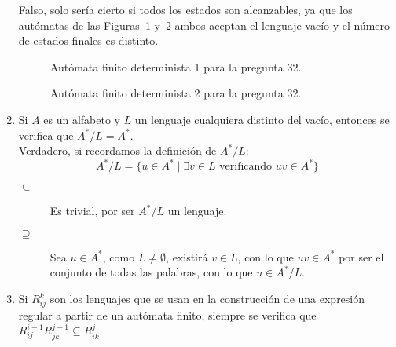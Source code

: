 \begin{enumerate}
        Falso, solo sería cierto si todos los estados son alcanzables, ya que los autómatas de las Figuras~\ref{fig:tipo_test32_1} y~\ref{fig:tipo_test32_2} ambos aceptan el lenguaje vacío y el número de estados finales es distinto.
        \begin{figure}[H]
           \centering
           \caption{Autómata finito determinista 1 para la pregunta 32.}
           \label{fig:tipo_test32_1}
       \end{figure}

       \begin{figure}[H]
           \centering
           \caption{Autómata finito determinista 2 para la pregunta 32.}
           \label{fig:tipo_test32_2}
       \end{figure}
    \item Si $A$ es un alfabeto y $L$ un lenguaje cualquiera distinto del vacío, entonces se verifica que $A^\ast / L = A^\ast$.\\

        Verdadero, si recordamos la definición de $A^\ast / L$:
        \begin{equation*}
            A^\ast / L = \{u\in A^\ast \mid \exists v\in L \text{\ verificando\ } uv\in A^\ast\}
        \end{equation*}
        \begin{description}
            \item [$\subseteq$] Es trivial, por ser $A^\ast / L$ un lenguaje.
            \item [$\supseteq$] Sea $u\in A^\ast$, como $L\neq \emptyset $, existirá $v\in L$, con lo que $uv\in A^\ast$ por ser el conjunto de todas las palabras, con lo que $u\in A^\ast/L$.
        \end{description}
    \item Si $R^k_{ij}$ son los lenguajes que se usan en la construcción de una expresión regular a partir de un autómata finito, siempre se verifica que $R^{i-1}_{ij}R^{j-1}_{jk}\subseteq R^{j}_{ik}$.\\


\end{enumerate}
